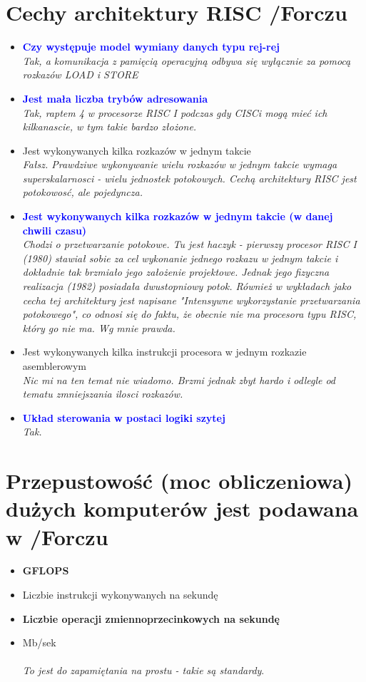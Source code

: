 \documentclass[a4paper,twoside]{article}
\begin{document}
\section{Cechy architektury RISC {\small /Forczu}}
	\begin{itemize}
    \item \textcolor{Blue}{\textbf{Czy występuje model wymiany danych typu rej-rej}}\\
    {\small \emph{Tak, a komunikacja z pamięcią operacyjną odbywa się wyłącznie za pomocą rozkazów LOAD i STORE}}
    \item \textcolor{Blue}{\textbf{Jest mała liczba trybów adresowania}}\\
    {\small \emph{Tak, raptem 4 w procesorze RISC I podczas gdy CISCi mogą mieć ich kilkanascie, w tym takie bardzo złożone.}}
    \item Jest wykonywanych kilka rozkazów w jednym takcie\\
    {\small \emph{Fałsz. Prawdziwe wykonywanie wielu rozkazów w jednym takcie wymaga superskalarnosci - wielu jednostek potokowych. Cechą architektury RISC jest potokowosć, ale pojedyncza.}}
    \item \textcolor{Blue}{\textbf{Jest wykonywanych kilka rozkazów w jednym takcie (w danej chwili czasu)}}\\
    {\small \emph{Chodzi o przetwarzanie potokowe. Tu jest haczyk - pierwszy procesor RISC I (1980) stawiał sobie za cel wykonanie \emph{jednego rozkazu w jednym takcie} i dokładnie tak brzmiało jego założenie projektowe. Jednak jego fizyczna realizacja (1982) posiadała dwustopniowy potok. Również w wykładach jako cecha tej architektury jest napisane "Intensywne wykorzystanie przetwarzania potokowego", co odnosi się do faktu, że obecnie nie ma procesora typu RISC, który go nie ma. Wg mnie prawda.}}
    \item Jest wykonywanych kilka instrukcji procesora w jednym rozkazie asemblerowym\\
    {\small \emph{Nic mi na ten temat nie wiadomo. Brzmi jednak zbyt hardo i odlegle od tematu zmniejszania ilosci rozkazów.}}
    \item \textcolor{Blue}{\textbf{Układ sterowania w postaci logiki szytej}}\\
    {\small \emph{Tak.}}
    \end{itemize}

\section{Przepustowość (moc obliczeniowa) dużych komputerów jest podawana w {\small /Forczu}}
	\begin{itemize}
    \item \textbf{GFLOPS}
    \item Liczbie instrukcji wykonywanych na sekundę
    \item \textbf{Liczbie operacji zmiennoprzecinkowych na sekundę}
    \item Mb/sek\\\\
    {\small \emph{To jest do zapamiętania na prostu - takie są standardy}}.
    \end{itemize}
\end{document}
